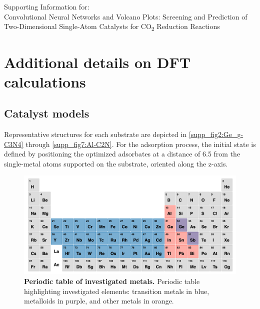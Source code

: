 
\begin{center}
  \Large{Supporting Information for:  \\
  Convolutional Neural Networks and Volcano Plots:
  Screening and Prediction of Two-Dimensional Single-Atom Catalysts for CO\textsubscript{2} Reduction Reactions}
\end{center}

\newpage
\section{Additional details on DFT calculations}

\subsection{Catalyst models}
\label{supp_sec2.1_catalysts}

Representative structures for each substrate are depicted in \cref{supp_fig2:Ge_g-C3N4} through \cref{supp_fig7:Al-C2N}. For the adsorption process, the initial state is defined by positioning the optimized adsorbates at a distance of 6.5 \text{\AA} from the single-metal atoms supported on the substrate, oriented along the z-axis.

\begin{figure}[htbp]
  \centering
  \includegraphics[width=\textwidth]{supp_fig1_ptable.png}
  \caption{\textbf{Periodic table of investigated metals.}
  Periodic table highlighting investigated elements: transition metals in blue, metalloids in purple, and other metals in orange.}
  \label{supp_fig1:ptable}
\end{figure}

